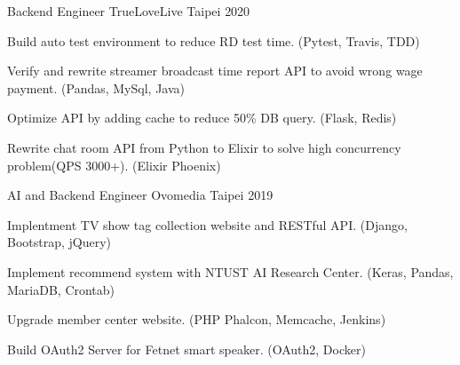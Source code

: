 

\begin{cventries}

  \cventry
    {Backend Engineer} %
    {TrueLoveLive} %
    {Taipei} %
    {2020} %
    {
      \begin{cvitems} %
        \item {Build auto test environment to reduce RD test time. (Pytest, Travis, TDD)}
        \item {Verify and rewrite streamer broadcast time report API to avoid wrong wage payment. (Pandas, MySql, Java)}
        \item {Optimize API by adding cache to reduce 50\% DB query. (Flask, Redis)}
        \item {Rewrite chat room API from Python to Elixir to solve high concurrency problem(QPS 3000+). (Elixir Phoenix)}
      \end{cvitems}
    }

  \cventry
    {AI and Backend Engineer} %
    {Ovomedia} %
    {Taipei} %
    {2019} %
    {
      \begin{cvitems} %
        \item {Implentment TV show tag collection website and RESTful API. (Django, Bootstrap, jQuery)}
        \item {Implement recommend system with NTUST AI Research Center. (Keras, Pandas, MariaDB, Crontab)}
        \item {Upgrade member center website. (PHP Phalcon, Memcache, Jenkins)}
        \item {Build OAuth2 Server for Fetnet smart speaker. (OAuth2, Docker)}
      \end{cvitems}
    }

\end{cventries}
